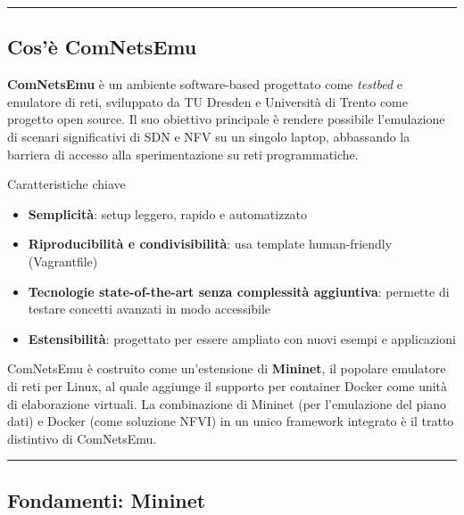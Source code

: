 \documentclass[
  italian,
  openany]{book}
\providecommand{\tightlist}{%
  \setlength{\itemsep}{0pt}\setlength{\parskip}{0pt}}
\begin{document}
\begin{center}\rule{0.5\linewidth}{0.5pt}\end{center}

\subsection{Cos'è ComNetsEmu}\label{cosuxe8-comnetsemu}

\textbf{ComNetsEmu} è un ambiente software-based progettato come
\emph{testbed} e emulatore di reti, sviluppato da TU Dresden e
Università di Trento come progetto open source. Il suo obiettivo
principale è rendere possibile l'emulazione di scenari significativi di
SDN e NFV su un singolo laptop, abbassando la barriera di accesso alla
sperimentazione su reti programmatiche.

\begin{calloutnote}{Caratteristiche chiave}

\begin{itemize}
\tightlist
\item
  \textbf{Semplicità}: setup leggero, rapido e automatizzato
\item
  \textbf{Riproducibilità e condivisibilità}: usa template
  human-friendly (Vagrantfile)
\item
  \textbf{Tecnologie state-of-the-art senza complessità aggiuntiva}:
  permette di testare concetti avanzati in modo accessibile
\item
  \textbf{Estensibilità}: progettato per essere ampliato con nuovi
  esempi e applicazioni
\end{itemize}

\end{calloutnote}

ComNetsEmu è costruito come un'estensione di \textbf{Mininet}, il
popolare emulatore di reti per Linux, al quale aggiunge il supporto per
container Docker come unità di elaborazione virtuali. La combinazione di
Mininet (per l'emulazione del piano dati) e Docker (come soluzione NFVI)
in un unico framework integrato è il tratto distintivo di ComNetsEmu.

\begin{center}\rule{0.5\linewidth}{0.5pt}\end{center}

\subsection{Fondamenti: Mininet}\label{fondamenti-mininet}
\end{document}

